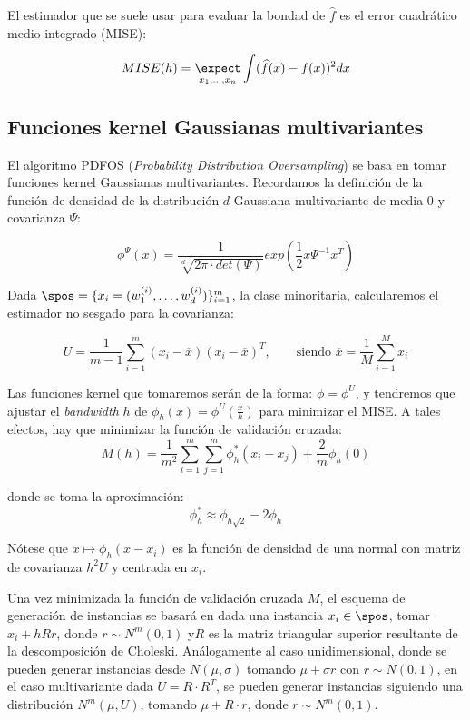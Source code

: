 El estimador que se suele usar para evaluar la bondad de $\widehat{f}$ es el error cuadrático medio integrado (MISE):

\[MISE(h) = \underset{x_1, \ldots, x_n}{\expect} \int (\widehat{f}(x) - f(x))^2 dx\]



\subsection{Funciones kernel Gaussianas multivariantes}
El algoritmo PDFOS (\textit{Probability Distribution Oversampling}) se basa en tomar funciones kernel Gaussianas multivariantes.
Recordamos la definición de la función de densidad de la distribución $d$-Gaussiana multivariante de media $0$ y covarianza $\Psi$:

\[\phi^{\Psi}(x) = \frac{1}{\sqrt[d]{2\pi \cdot det(\Psi)}} exp\left(\frac{1}{2} x \Psi^{-1} x^T \right)\]

Dada $\spos = \{x_i = (w_1^{(i)}, \ldots, w_d^{(i)})\}_{i=1}^m$, la clase minoritaria, calcularemos el estimador no sesgado 
para la covarianza:

\[U = \frac{1}{m-1} \sum_{i=1}^m (x_i - \overline{x})(x_i - \overline{x})^T, 
  \qquad \textrm{siendo } \overline{x} = \frac{1}{M}\sum_{i=1}^M x_i\]
  
Las funciones kernel que tomaremos serán de la forma: $\phi = \phi^{U}$, y tendremos que ajustar el \textit{bandwidth} $h$ de
$\phi_h(x) = \phi^U\left(\frac{x}{h}\right)$ para minimizar el MISE. A tales efectos, hay que minimizar la función de validación
cruzada:
\begin{equation}
 M(h) = \frac{1}{m^2} \sum_{i=1}^m \sum_{j=1}^m \phi_h^{\ast} (x_i - x_j) + \frac{2}{m} \phi_h(0)
 \label{eq:cross-val}
\end{equation}

donde se toma la aproximación:
\[\phi_h^{\ast} \approx \phi_{h\sqrt{2}} - 2\phi_h\]

Nótese que $x\mapsto \phi_h(x-x_i)$ es la función de densidad de una normal con matriz de covarianza $h^2 U$ y centrada en $x_i$.

Una vez minimizada la función de validación cruzada $M$, el esquema de generación de instancias se basará en dada una instancia
$x_i \in \spos$, tomar $x_i + h R r$, donde $r\sim N^m(0,1)$ y$R$ es la matriz triangular superior resultante de la descomposición
de Choleski. Análogamente al caso unidimensional, donde se pueden generar instancias desde $N(\mu, \sigma)$ tomando $\mu + \sigma r$
con $r\sim N(0,1)$, en el caso multivariante dada $U =  R \cdot R^T$, se pueden generar instancias siguiendo una distribución $N^m(\mu, U)$,
tomando $\mu + R \cdot r$, donde $r\sim N^m(0,1)$.

